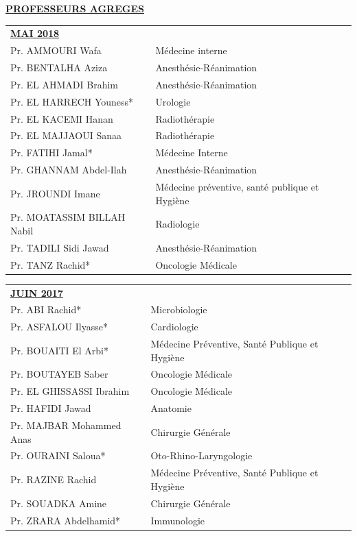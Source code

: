 \noindent\textbf{\underline{PROFESSEURS AGREGES}}

\begin{table}[H]
  \begin{tabular}{l l}
    \multicolumn{2}{l}{\textbf{\underline{MAI 2018}}}\vspace*{0.5em}\\
    Pr. AMMOURI Wafa & Médecine interne \\
    Pr. BENTALHA Aziza & Anesthésie-Réanimation \\
    Pr. EL AHMADI Brahim & Anesthésie-Réanimation \\
    Pr. EL HARRECH Youness* & Urologie \\
    Pr. EL KACEMI Hanan & Radiothérapie \\
    Pr. EL MAJJAOUI Sanaa & Radiothérapie \\
    Pr. FATIHI Jamal* & Médecine Interne \\
    Pr. GHANNAM Abdel-Ilah & Anesthésie-Réanimation \\
    Pr. JROUNDI Imane & Médecine préventive, santé publique et Hygiène \\
    Pr. MOATASSIM BILLAH Nabil & Radiologie \\
    Pr. TADILI Sidi Jawad & Anesthésie-Réanimation \\
    Pr. TANZ Rachid* & Oncologie Médicale \\
  \end{tabular}
\end{table}


\begin{table}[H]
  \begin{tabular}{l l}
    \multicolumn{2}{l}{\textbf{\underline{JUIN 2017}}}\vspace*{0.5em}\\
    Pr. ABI Rachid* & Microbiologie \\
    Pr. ASFALOU Ilyasse* & Cardiologie \\
    Pr. BOUAITI El Arbi* & Médecine Préventive, Santé Publique et Hygiène \\
    Pr. BOUTAYEB Saber & Oncologie Médicale \\
    Pr. EL GHISSASSI Ibrahim & Oncologie Médicale \\
    Pr. HAFIDI Jawad & Anatomie \\
    Pr. MAJBAR Mohammed Anas & Chirurgie Générale \\
    Pr. OURAINI Saloua* & Oto-Rhino-Laryngologie \\
    Pr. RAZINE Rachid & Médecine Préventive, Santé Publique et Hygiène \\
    Pr. SOUADKA Amine & Chirurgie Générale \\
    Pr. ZRARA Abdelhamid* & Immunologie \\
  \end{tabular}
\end{table}


